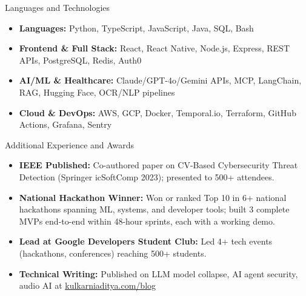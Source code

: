 \documentclass[]{mcdowellcv}
\begin{document}
\begin{cvsection}{Languages and Technologies}
  \begin{cvsubsection}{}{}{}
    \begin{itemize}
      \item \textbf{Languages:} Python, TypeScript, JavaScript, Java, SQL, Bash
      \item \textbf{Frontend \& Full Stack:} React, React Native, Node.js, Express, REST APIs, PostgreSQL, Redis, Auth0
      \item \textbf{AI/ML \& Healthcare:} Claude/GPT-4o/Gemini APIs, MCP, LangChain, RAG, Hugging Face, OCR/NLP pipelines
      \item \textbf{Cloud \& DevOps:} AWS, GCP, Docker, Temporal.io, Terraform, GitHub Actions, Grafana, Sentry
    \end{itemize}
  \end{cvsubsection}
\end{cvsection}

\begin{cvsection}{Additional Experience and Awards}
  \begin{cvsubsection}{}{}{}
    \begin{itemize}
      \item \textbf{IEEE Published:} Co-authored paper on CV-Based Cybersecurity Threat Detection (Springer icSoftComp 2023); presented to 500+ attendees.
      \item \textbf{National Hackathon Winner:} Won or ranked Top 10 in 6+ national hackathons spanning ML, systems, and developer tools; built 3 complete MVPs end-to-end within 48-hour sprints, each with a working demo.
      \item \textbf{Lead at Google Developers Student Club:} Led 4+ tech events (hackathons, conferences) reaching 500+ students.
      \item \textbf{Technical Writing:} Published on LLM model collapse, AI agent security, audio AI at \href{https://www.kulkarniaditya.com/blog}{kulkarniaditya.com/blog}
    \end{itemize}
  \end{cvsubsection}
\end{cvsection}
\end{document}
